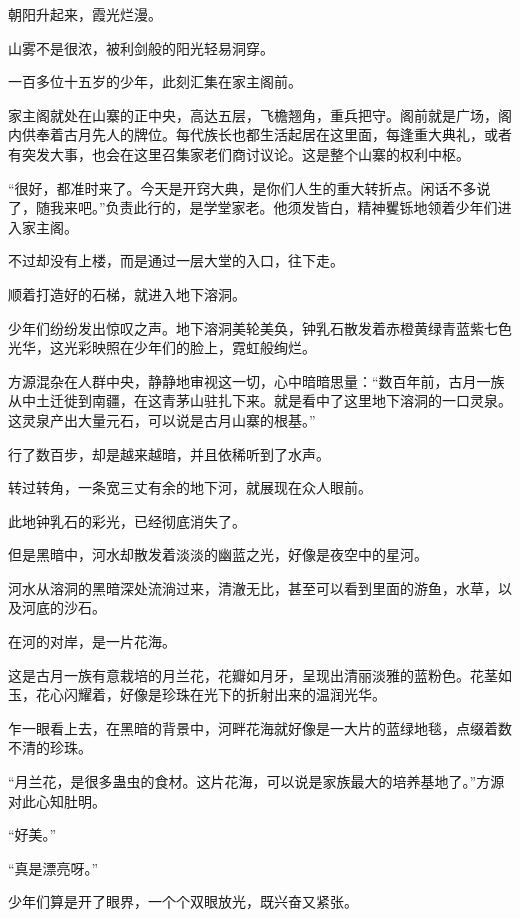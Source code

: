 
\begin{this_body}

朝阳升起来，霞光烂漫。

山雾不是很浓，被利剑般的阳光轻易洞穿。

一百多位十五岁的少年，此刻汇集在家主阁前。

家主阁就处在山寨的正中央，高达五层，飞檐翘角，重兵把守。阁前就是广场，阁内供奉着古月先人的牌位。每代族长也都生活起居在这里面，每逢重大典礼，或者有突发大事，也会在这里召集家老们商讨议论。这是整个山寨的权利中枢。

“很好，都准时来了。今天是开窍大典，是你们人生的重大转折点。闲话不多说了，随我来吧。”负责此行的，是学堂家老。他须发皆白，精神矍铄地领着少年们进入家主阁。

不过却没有上楼，而是通过一层大堂的入口，往下走。

顺着打造好的石梯，就进入地下溶洞。

少年们纷纷发出惊叹之声。地下溶洞美轮美奂，钟乳石散发着赤橙黄绿青蓝紫七色光华，这光彩映照在少年们的脸上，霓虹般绚烂。

方源混杂在人群中央，静静地审视这一切，心中暗暗思量：“数百年前，古月一族从中土迁徙到南疆，在这青茅山驻扎下来。就是看中了这里地下溶洞的一口灵泉。这灵泉产出大量元石，可以说是古月山寨的根基。”

行了数百步，却是越来越暗，并且依稀听到了水声。

转过转角，一条宽三丈有余的地下河，就展现在众人眼前。

此地钟乳石的彩光，已经彻底消失了。

但是黑暗中，河水却散发着淡淡的幽蓝之光，好像是夜空中的星河。

河水从溶洞的黑暗深处流淌过来，清澈无比，甚至可以看到里面的游鱼，水草，以及河底的沙石。

在河的对岸，是一片花海。

这是古月一族有意栽培的月兰花，花瓣如月牙，呈现出清丽淡雅的蓝粉色。花茎如玉，花心闪耀着，好像是珍珠在光下的折射出来的温润光华。

乍一眼看上去，在黑暗的背景中，河畔花海就好像是一大片的蓝绿地毯，点缀着数不清的珍珠。

“月兰花，是很多蛊虫的食材。这片花海，可以说是家族最大的培养基地了。”方源对此心知肚明。

“好美。”

“真是漂亮呀。”

少年们算是开了眼界，一个个双眼放光，既兴奋又紧张。


\end{this_body}
